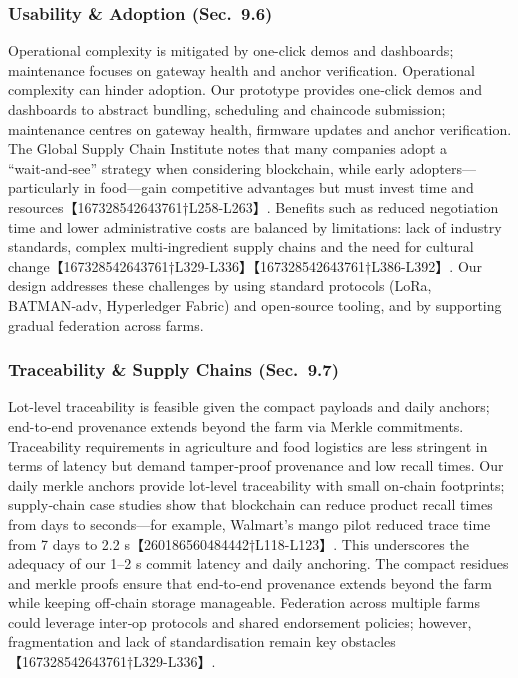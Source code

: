 \documentclass[12pt,onecolumn]{IEEEtran} %
\begin{document}
\subsubsection{Usability \& Adoption (Sec.~9.6)}
Operational complexity is mitigated by one-click demos and dashboards; maintenance focuses on gateway health and anchor verification. Operational complexity can hinder adoption.  Our prototype provides one‑click demos and dashboards to abstract bundling, scheduling and chaincode submission; maintenance centres on gateway health, firmware updates and anchor verification.  The Global Supply Chain Institute notes that many companies adopt a ``wait‑and‑see'' strategy when considering blockchain, while early adopters—particularly in food—gain competitive advantages but must invest time and resources【167328542643761†L258-L263】.  Benefits such as reduced negotiation time and lower administrative costs are balanced by limitations: lack of industry standards, complex multi‑ingredient supply chains and the need for cultural change【167328542643761†L329-L336】【167328542643761†L386-L392】.  Our design addresses these challenges by using standard protocols (LoRa, BATMAN‑adv, Hyperledger Fabric) and open‑source tooling, and by supporting gradual federation across farms.

\subsubsection{Traceability \& Supply Chains (Sec.~9.7)}
Lot-level traceability is feasible given the compact payloads and daily anchors; end-to-end provenance extends beyond the farm via Merkle commitments. Traceability requirements in agriculture and food logistics are less stringent in terms of latency but demand tamper‑proof provenance and low recall times.  Our daily merkle anchors provide lot‑level traceability with small on‑chain footprints; supply‑chain case studies show that blockchain can reduce product recall times from days to seconds—for example, Walmart’s mango pilot reduced trace time from 7 days to 2.2 s【260186560484442†L118-L123】.  This underscores the adequacy of our 1–2 s commit latency and daily anchoring.  The compact residues and merkle proofs ensure that end‑to‑end provenance extends beyond the farm while keeping off‑chain storage manageable.  Federation across multiple farms could leverage inter‑op protocols and shared endorsement policies; however, fragmentation and lack of standardisation remain key obstacles【167328542643761†L329-L336】.
\end{document}
